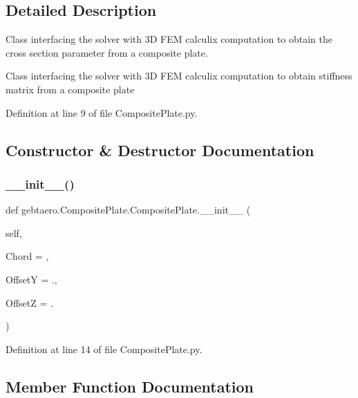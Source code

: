 \subsection{Detailed Description}
Class interfacing the solver with 3D F\+EM calculix computation to obtain the cross section parameter from a composite plate. 

\begin{DoxyVerb}Class interfacing the solver with 3D FEM calculix computation to obtain stiffness matrix
from a composite plate
\end{DoxyVerb}
 

Definition at line 9 of file Composite\+Plate.\+py.



\subsection{Constructor \& Destructor Documentation}
\mbox{\label{classgebtaero_1_1_composite_plate_1_1_composite_plate_a067ac11419d1959770398cce5de0a561}} 
\subsubsection{\texorpdfstring{\+\_\+\+\_\+init\+\_\+\+\_\+()}{\_\_init\_\_()}}
{\footnotesize\ttfamily def gebtaero.\+Composite\+Plate.\+Composite\+Plate.\+\_\+\+\_\+init\+\_\+\+\_\+ (\begin{DoxyParamCaption}\item[{}]{self,  }\item[{}]{Chord = {},  }\item[{}]{OffsetY = {.},  }\item[{}]{OffsetZ = {.} }\end{DoxyParamCaption})}



Definition at line 14 of file Composite\+Plate.\+py.



\subsection{Member Function Documentation}
\mbox{\label{classgebtaero_1_1_composite_plate_1_1_composite_plate_ab41dbc2cc5c5a502f3b1d4b9bc51fbf5}} 
